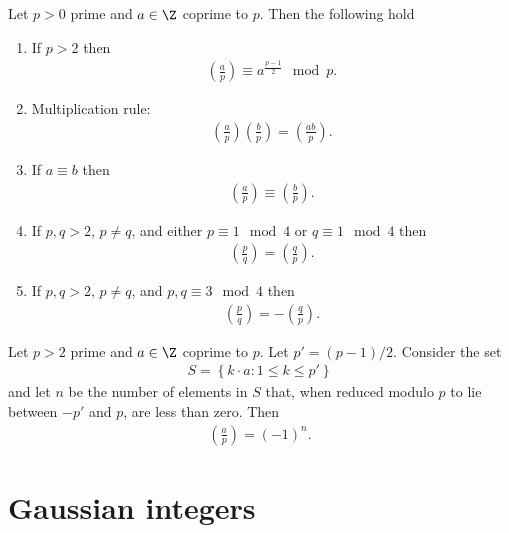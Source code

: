 \documentclass{article}
\begin{document}
\begin{theorem}[Lecture 11]
    Let $p>0$ prime and $a\in\Z$ coprime to $p$. Then the following hold 
    \begin{enumerate}
        \item If $p>2$ then \begin{align*}
            \left(\frac{a}{p}\right)\equiv a^{\frac{p-1}{2}} \mod p.
        \end{align*}
        \item Multiplication rule: \begin{align*}
            \left(\frac{a}{p}\right)\left(\frac{b}{p}\right)=\left(\frac{ab}{p}\right).
        \end{align*}
        \item If $a\equiv b$ then \begin{align*}
            \left(\frac{a}{p}\right)\equiv\left(\frac{b}{p}\right).
        \end{align*}
        \item If $p,q>2$, $p\not=q$, and either $p\equiv 1\mod 4$ or $q\equiv 1\mod 4$ then \begin{align*}
            \left(\frac{p}{q}\right)=\left(\frac{q}{p}\right).
        \end{align*}
        \item If $p,q>2$, $p\not=q$, and $p,q\equiv 3\mod 4$ then \begin{align*}
            \left(\frac{p}{q}\right)=-\left(\frac{q}{p}\right).
        \end{align*}
    \end{enumerate}
\end{theorem}

\begin{lemma}[Gauss]
    Let $p>2$ prime and $a\in\Z$ coprime to $p$. Let $p'=(p-1)/2$. Consider the set 
    \begin{align*}
        S=\left\lbrace k\cdot a : 1\leq k\leq p'\right\rbrace
    \end{align*} 
    and let $n$ be the number of elements in $S$ that, when reduced modulo $p$ to lie between
    $-p'$ and $p$, are less than zero. Then 
    \begin{align*}
        \left(\frac{a}{p}\right)=(-1)^n.
    \end{align*}
\end{lemma}

\section{Gaussian integers}
\end{document}
